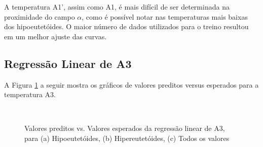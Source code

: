 \documentclass[brazil,tf,epusp]{usp}  %
\begin{document}
A temperatura A1', assim como A1, é mais difícil de ser determinada na proximidade do campo $\alpha$, como é possível notar nas temperaturas mais baixas dos hipoeutetóides. O maior número de dados utilizados para o treino resultou em um melhor ajuste das curvas.

\subsection{Regressão Linear de A3}

A Figura \ref{fig:LR_A3} a seguir mostra os gráficos de valores preditos versus esperados para a temperatura A3.

\begin{figure}[!h]
\hfill
{}\\
\caption{Valores preditos vs. Valores esperados da regressão linear de A3, para (a) Hipoeutetóides, (b) Hipereutetóides, (c) Todos os valores}
\label{fig:LR_A3}
\end{figure}
\end{document}
